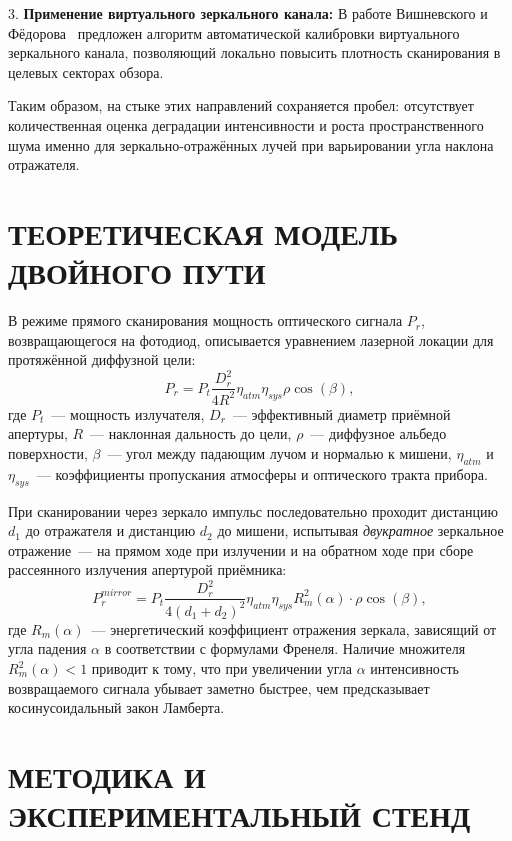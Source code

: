 \documentclass{misisarticle}
\begin{document}
3. \textbf{Применение виртуального зеркального канала:} В работе Вишневского и Фёдорова~\cite{vishnevsky2026} предложен алгоритм автоматической калибровки виртуального зеркального канала, позволяющий локально повысить плотность сканирования в целевых секторах обзора.

Таким образом, на стыке этих направлений сохраняется пробел: отсутствует количественная оценка деградации интенсивности и роста пространственного шума именно для зеркально-отражённых лучей при варьировании угла наклона отражателя.

\section{ТЕОРЕТИЧЕСКАЯ МОДЕЛЬ ДВОЙНОГО ПУТИ}

В режиме прямого сканирования мощность оптического сигнала $P_r$, возвращающегося на фотодиод, описывается уравнением лазерной локации для протяжённой диффузной цели:
\begin{equation}
P_r = P_t \frac{D_r^2}{4 R^2} \eta_{atm} \eta_{sys} \rho \cos(\beta),
\end{equation}
где $P_t$~--- мощность излучателя, $D_r$~--- эффективный диаметр приёмной апертуры, $R$~--- наклонная дальность до цели, $\rho$~--- диффузное альбедо поверхности, $\beta$~--- угол между падающим лучом и нормалью к мишени, $\eta_{atm}$ и $\eta_{sys}$~--- коэффициенты пропускания атмосферы и оптического тракта прибора.

При сканировании через зеркало импульс последовательно проходит дистанцию $d_1$ до отражателя и дистанцию $d_2$ до мишени, испытывая \textit{двукратное} зеркальное отражение~--- на прямом ходе при излучении и на обратном ходе при сборе рассеянного излучения апертурой приёмника:
\begin{equation}
P_r^{mirror} = P_t \frac{D_r^2}{4 (d_1 + d_2)^2} \eta_{atm} \eta_{sys} R_m^2(\alpha) \cdot \rho \cos(\beta),
\end{equation}
где $R_m(\alpha)$~--- энергетический коэффициент отражения зеркала, зависящий от угла падения $\alpha$ в соответствии с формулами Френеля. Наличие множителя $R_m^2(\alpha) < 1$ приводит к тому, что при увеличении угла $\alpha$ интенсивность возвращаемого сигнала убывает заметно быстрее, чем предсказывает косинусоидальный закон Ламберта.

\section{МЕТОДИКА И ЭКСПЕРИМЕНТАЛЬНЫЙ СТЕНД}
\end{document}
